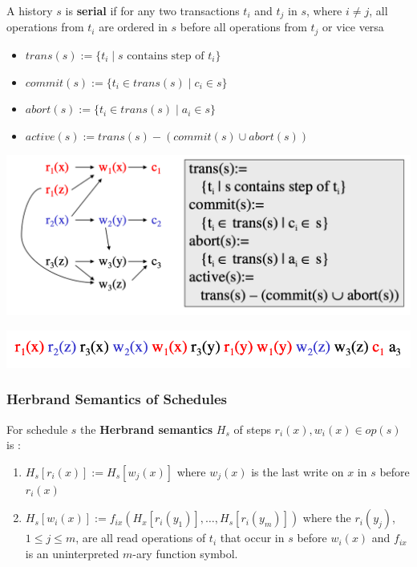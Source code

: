 \documentclass[11pt]{article}
\begin{document}
\begin{definition}[]
A history \(s\) is \textbf{serial} if for any two transactions \(t_i\) and \(t_j\) in \(s\),
where \(i\neq j\), all operations from \(t_i\) are ordered in \(s\) before all operations
from \(t_j\) or vice versa
\end{definition}

\begin{definition}[]
\begin{itemize}
\item \(trans(s):=\{t_i\mid s\text{ contains step of }t_i\}\)
\item \(commit(s):=\{t_i\in trans(s)\mid c_i\in s\}\)
\item \(abort(s):=\{t_i\in trans(s)\mid a_i\in s\}\)
\item \(active(s):=trans(s)-(commit(s)\cup abort(s))\)
\end{itemize}
\end{definition}


\begin{center}
\includegraphics[width=.8\textwidth]{../images/bigdatabase/6.png}
\label{}
\end{center}

\begin{center}
\includegraphics[width=.8\textwidth]{../images/bigdatabase/5.png}
\label{}
\end{center}
\subsubsection{Herbrand Semantics of Schedules}
\label{sec:orgb97290a}
\begin{definition}
For schedule \(s\) the \textbf{Herbrand semantics} \(H_s\) of steps \(r_i(x),w_i(x)\in op(s)\) is :
\begin{enumerate}
\item \(H_s[r_i(x)]:=H_s[w_j(x)]\) where \(w_j(x)\) is the last write on \(x\) in \(s\)
before \(r_i(x)\)
\item \(H_s[w_i(x)]:=f_{ix}(H_x[r_i(y_1)],\dots,H_s[r_i(y_m)])\) where
the \(r_i(y_j)\), \(1\le j\le m\), are all read operations of \(t_i\) that occur in \(s\)
before \(w_i(x)\) and \(f_{ix}\) is an uninterpreted \(m\)-ary function symbol.
\end{enumerate}
\end{definition}
\end{document}
